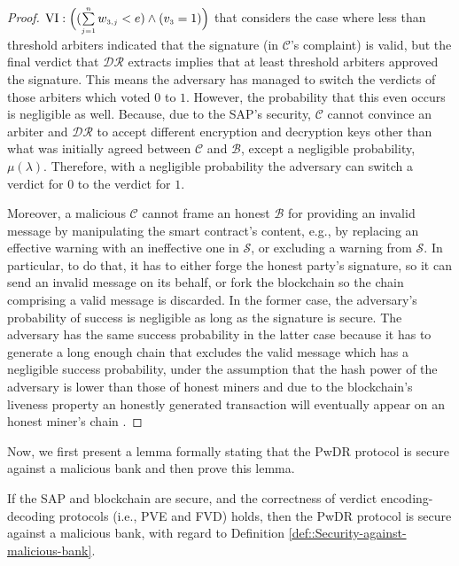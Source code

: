 \begin{proof}
 $\text{\MakeUppercase{\romannumeral 6}}: \Big((\sum\limits_{\st j=1}^{\st n}w_{\st 3,j}< {e}) \wedge ( {v}_{\st 3}=1)\Big)$ that considers the case where less than threshold arbiters indicated that the signature (in $\mathcal{C}$'s complaint) is valid, but   the final verdict that $\mathcal{DR}$ extracts implies that at least threshold  arbiters approved the signature. This means the adversary has managed to switch the verdicts of those arbiters which voted $0$ to $1$. However, the probability that this even occurs is negligible as well. Because, due to the SAP's security,  $\mathcal{C}$ cannot convince  an arbiter and $\mathcal{DR}$ to accept   different encryption and decryption keys other than what was initially agreed between $\mathcal{C}$ and $\mathcal{B}$, except a negligible probability, $\mu(\lambda)$.  Therefore, with a negligible probability the adversary can switch a verdict for $0$ to the verdict for $1$. 
 
 
 Moreover, a malicious $\mathcal{C}$ cannot frame an honest $\mathcal{B}$ for providing an invalid message by manipulating the smart contract’s content,  e.g., by replacing an effective warning with an ineffective one in $\mathcal{S}$, or excluding a warning from $\mathcal{S}$. In particular, to do that, it has to either  forge the honest party’s signature, so it can send an invalid message on its behalf, or fork the blockchain so the chain comprising a valid message is discarded. In the former case, the adversary’s probability of success is negligible as long as the signature is secure. The adversary has the same success probability in the latter case because it has to generate a long enough chain that excludes the valid message which has a negligible success probability, under the assumption that the hash power of the adversary is lower than those of honest miners and due to the blockchain’s liveness property an honestly generated transaction will eventually appear on an honest miner’s chain \cite{GarayKL15}. 
\end{proof}


Now, we first present a lemma   formally stating that the PwDR protocol is secure against a malicious bank and then prove this lemma. 

\begin{lemma}\label{lemma::secure-against-a-malicious-bank} If the  SAP and  blockchain are secure, and the correctness of verdict encoding-decoding protocols (i.e., PVE and FVD) holds, then the PwDR protocol is secure against a malicious bank, with regard to Definition \ref{def::Security-against-malicious-bank}. 
\end{lemma}



